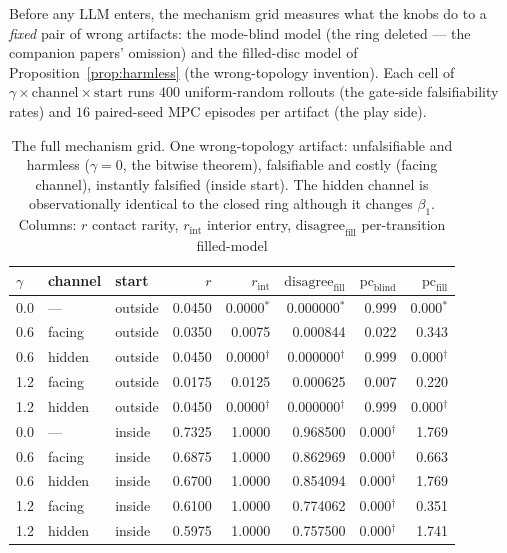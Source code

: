 \documentclass[11pt]{article}
\theoremstyle{remark}
\begin{document}
Before any LLM enters, the mechanism grid measures what the knobs do to a
\emph{fixed} pair of wrong artifacts: the mode-blind model (the ring
deleted --- the companion papers' omission) and the filled-disc model of
Proposition~\ref{prop:harmless} (the wrong-topology invention). Each cell
of $\gamma \times \text{channel} \times \text{start}$ runs $400$
uniform-random rollouts (the gate-side falsifiability rates) and $16$
paired-seed MPC episodes per artifact (the play side).

\begin{table}[h]
\centering
\small
\begin{tabular}{lllrrrrr}
\toprule
$\gamma$ & channel & start & $r$ & $r_{\mathrm{int}}$ &
$\mathrm{disagree}_{\mathrm{fill}}$ &
$\mathrm{pc}_{\mathrm{blind}}$ & $\mathrm{pc}_{\mathrm{fill}}$ \\
\midrule
0.0 & ---     & outside & 0.0450 & 0.0000$^{\ast}$ & 0.000000$^{\ast}$ & 0.999 & 0.000$^{\ast}$ \\
0.6 & facing  & outside & 0.0350 & 0.0075 & 0.000844 & 0.022 & 0.343 \\
0.6 & hidden  & outside & 0.0450 & 0.0000$^{\dagger}$ & 0.000000$^{\dagger}$ & 0.999 & 0.000$^{\dagger}$ \\
1.2 & facing  & outside & 0.0175 & 0.0125 & 0.000625 & 0.007 & 0.220 \\
1.2 & hidden  & outside & 0.0450 & 0.0000$^{\dagger}$ & 0.000000$^{\dagger}$ & 0.999 & 0.000$^{\dagger}$ \\
0.0 & ---     & inside  & 0.7325 & 1.0000 & 0.968500 & 0.000$^{\dagger}$ & 1.769 \\
0.6 & facing  & inside  & 0.6875 & 1.0000 & 0.862969 & 0.000$^{\dagger}$ & 0.663 \\
0.6 & hidden  & inside  & 0.6700 & 1.0000 & 0.854094 & 0.000$^{\dagger}$ & 1.769 \\
1.2 & facing  & inside  & 0.6100 & 1.0000 & 0.774062 & 0.000$^{\dagger}$ & 0.351 \\
1.2 & hidden  & inside  & 0.5975 & 1.0000 & 0.757500 & 0.000$^{\dagger}$ & 1.741 \\
\bottomrule
\end{tabular}
\caption{The full mechanism grid. One wrong-topology artifact:
unfalsifiable and harmless ($\gamma = 0$, the bitwise theorem), falsifiable
and costly (facing channel), instantly falsified (inside start). The hidden
channel is observationally identical to the closed ring although it changes
$\beta_1$. Columns: $r$ contact rarity, $r_{\mathrm{int}}$ interior
entry, $\mathrm{disagree}_{\mathrm{fill}}$ per-transition filled-model
}
\end{table}
\end{document}
